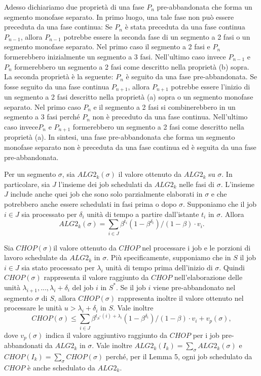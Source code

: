 \documentclass[12pt]{article}
\begin{document}
Adesso dichiariamo due proprietà di una fase $P_{n}$ pre-abbandonata che forma un segmento monofase separato. In primo luogo, una tale fase non può essere preceduta da una fase continua: Se $P_{n}$ è stata preceduta da una fase continua $P_{n-1}$, allora $P_{n-1}$ potrebbe essere la seconda fase di un segmento a 2 fasi o un segmento monofase separato. Nel primo caso il segmento a 2 fasi e $P_{n}$ formerebbero inizialmente un segmento a 3 fasi. Nell'ultimo caso invece $P_{n-1}$ e $P_{n}$ formerebbero un segmento a 2 fasi come descritto nella proprietà (b) sopra. La seconda proprietà è la seguente: $P_{n}$ è seguito da una fase pre-abbandonata. Se fosse seguito da una fase continua $P_{n+1}$, allora $P_{n+1}$ potrebbe essere l'inizio di un segmento a 2 fasi descritto nella proprietà (a) sopra o un segmento monofase separato. Nel primo caso $P_{n}$ e il segmento a 2 fasi si combinerebbero in un segmento a 3 fasi perché $P_{n}$ non è preceduto da una fase continua. Nell'ultimo caso invece$P_{n}$ e $P_{n+1}$ formerebbero un segmento a 2 fasi come descritto nella proprietà (a). In sintesi, una fase pre-abbandonata che forma un segmento monofase separato non è preceduta da una fase continua ed è seguita da una fase pre-abbandonata.

Per un segmento $\sigma$, sia $ALG2_{k}(\sigma)$ il valore ottenuto da $ALG2_{k}$ su $\sigma$. In particolare, sia $J$ l'insieme dei job schedulati da $ALG2_{k}$ nelle fasi di $\sigma$. L'insieme $J$ include anche quei job che sono solo parzialmente elaborati in $\sigma$ e che potrebbero anche essere schedulati in fasi prima o dopo $\sigma$. Supponiamo che il job $i \in J$ sia processato per $\delta_{i}$ unità di tempo a partire dall'istante $t_{i}$ in $\sigma$. Allora
$$ALG2_{k}(\sigma) = \sum_{i \in J} \beta^{t_{i}}(1 - \beta^{\delta_{i}})/(1 - \beta) \cdot v_{i}.$$

Sia $CHOP(\sigma)$il valore ottenuto da $CHOP$ nel processare i job  e le porzioni di lavoro schedulate da $ALG2_{k}$ in $\sigma$. Più specificamente, supponiamo che in $S$ il job $i \in J$ sia stato processato per $\lambda_{i}$ unità di tempo prima dell'inizio di $\sigma$. Quindi $CHOP(\sigma)$ rappresenta il valore raggiunto da $CHOP$ nell'elaborazione delle unità $\lambda_{i +1}, ..., \lambda_{i} + \delta_{i}$ del job $i$ in $S^{*}$. Se il job $i$ viene pre-abbandonato nel segmento $\sigma$ di $S$, allora $CHOP(\sigma)$ rappresenta inoltre il valore ottenuto nel processare le unità $u > \lambda_{i} + \delta_{i}$ in $S$. Vale inoltre
$$CHOP(\sigma) \leq \sum_{i \in J} \beta^{t_{S^{*}}(i)+\lambda_{i}} (1 - \beta^{\delta_{i}})/(1 - \beta) \cdot v_{i} + v_{p}(\sigma),$$
dove $v_{p}(\sigma)$ indica il valore aggiuntivo raggiunto da $CHOP$ per i job pre-abbandonati da $ALG2_{k}$ in $\sigma$. Vale inoltre $ALG2_{k}(I_{k}) = \sum_{\sigma} ALG2_{k}(\sigma)$ e $CHOP(I_{k}) =\sum_{\sigma}CHOP(\sigma)$ perché, per il Lemma 5, ogni job schedulato da $CHOP$ è anche schedulato da $ALG2_{k}$.
\end{document}
